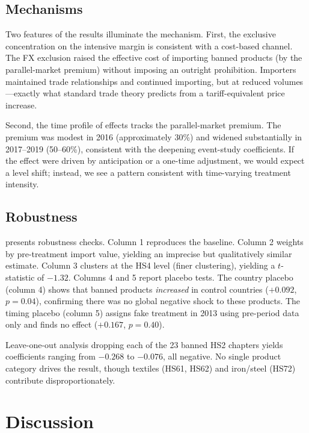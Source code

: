 \documentclass[12pt]{article}
\begin{document}
\subsection{Mechanisms}

Two features of the results illuminate the mechanism. First, the exclusive concentration on the intensive margin is consistent with a cost-based channel. The FX exclusion raised the effective cost of importing banned products (by the parallel-market premium) without imposing an outright prohibition. Importers maintained trade relationships and continued importing, but at reduced volumes---exactly what standard trade theory predicts from a tariff-equivalent price increase.

Second, the time profile of effects tracks the parallel-market premium. The premium was modest in 2016 (approximately 30\%) and widened substantially in 2017--2019 (50--60\%), consistent with the deepening event-study coefficients. If the effect were driven by anticipation or a one-time adjustment, we would expect a level shift; instead, we see a pattern consistent with time-varying treatment intensity.

\subsection{Robustness}



 presents robustness checks. Column 1 reproduces the baseline. Column 2 weights by pre-treatment import value, yielding an imprecise but qualitatively similar estimate. Column 3 clusters at the HS4 level (finer clustering), yielding a $t$-statistic of $-1.32$. Columns 4 and 5 report placebo tests. The country placebo (column 4) shows that banned products \textit{increased} in control countries ($+0.092$, $p = 0.04$), confirming there was no global negative shock to these products. The timing placebo (column 5) assigns fake treatment in 2013 using pre-period data only and finds no effect ($+0.167$, $p = 0.40$).

Leave-one-out analysis dropping each of the 23 banned HS2 chapters yields coefficients ranging from $-0.268$ to $-0.076$, all negative. No single product category drives the result, though textiles (HS61, HS62) and iron/steel (HS72) contribute disproportionately.

\section{Discussion}
\end{document}
